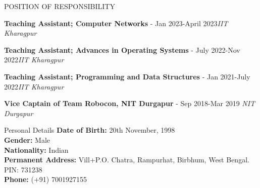 \documentclass{resume} %
\begin{document}
	\begin{rSection}{POSITION OF RESPONSIBILITY}
		
		{\bf Teaching Assistant; Computer Networks} - Jan 2023-April 2023\hfill {\em IIT Kharagpur}
		
		{\bf Teaching Assistant; Advances in Operating Systems} - July 2022-Nov 2022\hfill {\em IIT Kharagpur}
		
		{\bf Teaching Assistant; Programming and Data Structures} - Jan 2021-July 2022\hfill {\em IIT Kharagpur} 
		
		{\bf Vice Captain of Team Robocon, NIT Durgapur} - Sep 2018-Mar 2019 \hfill {\em NIT Durgapur} 
		
		
	\end{rSection}
	
	\begin{rSection}{Personal Details}
		\textbf{Date of Birth:} 20th November, 1998 \\
		\textbf{Gender:} Male \\ 
		\textbf{Nationality:} Indian\\
		\textbf{Permanent Address:} Vill+P.O. Chatra, Rampurhat, Birbhum, West Bengal. PIN: 731238\\
		\textbf{Phone:} (+91) 7001927155
		
	\end{rSection}
	
\end{document}
